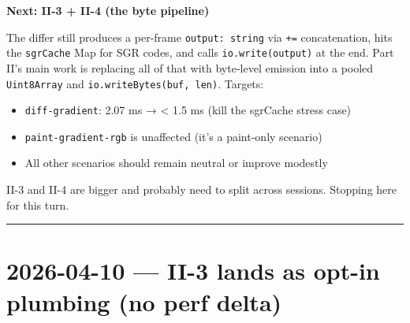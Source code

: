 \textbf{Next: II-3 + II-4 (the byte pipeline)}

The differ still produces a per-frame \texttt{o\allowbreak{}u\allowbreak{}t\allowbreak{}p\allowbreak{}u\allowbreak{}t\allowbreak{}:\allowbreak{} \allowbreak{}s\allowbreak{}t\allowbreak{}r\allowbreak{}i\allowbreak{}n\allowbreak{}g} via \texttt{+\allowbreak{}=} concatenation, hits the \texttt{s\allowbreak{}g\allowbreak{}r\allowbreak{}C\allowbreak{}a\allowbreak{}c\allowbreak{}h\allowbreak{}e} Map for SGR codes, and calls \texttt{i\allowbreak{}o\allowbreak{}.\allowbreak{}w\allowbreak{}r\allowbreak{}i\allowbreak{}t\allowbreak{}e\allowbreak{}(\allowbreak{}o\allowbreak{}u\allowbreak{}t\allowbreak{}p\allowbreak{}u\allowbreak{}t\allowbreak{})} at the end. Part II's main work is replacing all of that with byte-level emission into a pooled \texttt{U\allowbreak{}i\allowbreak{}n\allowbreak{}t\allowbreak{}8\allowbreak{}A\allowbreak{}r\allowbreak{}r\allowbreak{}a\allowbreak{}y} and \texttt{i\allowbreak{}o\allowbreak{}.\allowbreak{}w\allowbreak{}r\allowbreak{}i\allowbreak{}t\allowbreak{}e\allowbreak{}B\allowbreak{}y\allowbreak{}t\allowbreak{}e\allowbreak{}s\allowbreak{}(\allowbreak{}b\allowbreak{}u\allowbreak{}f\allowbreak{},\allowbreak{} \allowbreak{}l\allowbreak{}e\allowbreak{}n\allowbreak{})}. Targets:

\begin{itemize}
\tightlist
\item
  \texttt{d\allowbreak{}i\allowbreak{}f\allowbreak{}f\allowbreak{}-\allowbreak{}g\allowbreak{}r\allowbreak{}a\allowbreak{}d\allowbreak{}i\allowbreak{}e\allowbreak{}n\allowbreak{}t}: 2.07 ms → \textless{} 1.5 ms (kill the sgrCache stress case)
\item
  \texttt{p\allowbreak{}a\allowbreak{}i\allowbreak{}n\allowbreak{}t\allowbreak{}-\allowbreak{}g\allowbreak{}r\allowbreak{}a\allowbreak{}d\allowbreak{}i\allowbreak{}e\allowbreak{}n\allowbreak{}t\allowbreak{}-\allowbreak{}r\allowbreak{}g\allowbreak{}b} is unaffected (it's a paint-only scenario)
\item
  All other scenarios should remain neutral or improve modestly
\end{itemize}

II-3 and II-4 are bigger and probably need to split across sessions. Stopping here for this turn.

\begin{center}\rule{0.5\linewidth}{0.5pt}\end{center}

\section{2026-04-10 --- II-3 lands as opt-in plumbing (no perf delta)}\label{record-422-ii-3-lands-as-opt-in-plumbing-no-perf-delta}

